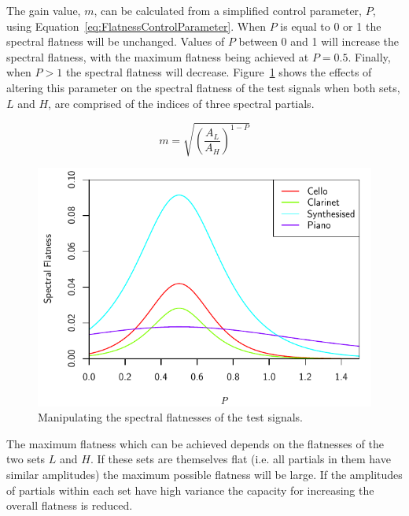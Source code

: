		The gain value, $m$, can be calculated from a simplified control parameter, $P$, using
		Equation~\ref{eq:FlatnessControlParameter}. When $P$ is equal to 0 or 1 the spectral flatness will be
		unchanged.  Values of $P$ between 0 and 1 will increase the spectral flatness, with the maximum flatness
		being achieved at $P = 0.5$. Finally, when $P > 1$ the spectral flatness will decrease.
		Figure~\ref{fig:MoveFlatnesses} shows the effects of altering this parameter on the spectral flatness of
		the test signals when both sets, $L$ and $H$, are comprised of the indices of three spectral partials.

		\begin{equation}
			m = \sqrt{ \left( \frac{A_L}{A_H} \right) ^{1 - P}}
			\label{eq:FlatnessControlParameter}
		\end{equation}

		\begin{figure}[h!]
			\centering
			\includegraphics{chapter6/Images/MoveFlatnesses.pdf}
			\caption{Manipulating the spectral flatnesses of the test signals.}
			\label{fig:MoveFlatnesses}
		\end{figure}

		The maximum flatness which can be achieved depends on the flatnesses of the two sets $L$ and $H$.  If these
		sets are themselves flat (i.e. all partials in them have similar amplitudes) the maximum possible flatness
		will be large. If the amplitudes of partials within each set have high variance the capacity for increasing
		the overall flatness is reduced.

